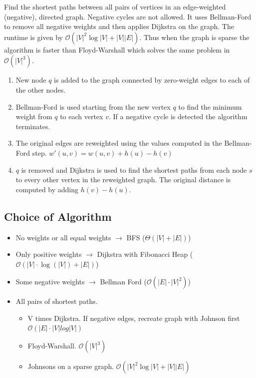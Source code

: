 \documentclass[9pt,landscape,a4paper, table]{extarticle}
\begin{document}
\begin{multicols*}{3}
Find the shortest paths between all pairs of vertices in an edge-weighted (negative), directed graph. Negative cycles are not allowed. It uses Bellman-Ford to remove all negative weights and then applies Dijkstra on the graph. The runtime is given by $\mathcal{O}(|V|^{2}\log |V|+|V||E|)$. Thus when the graph is sparse the algorithm is faster than Floyd-Warshall which solves the same problem in $\mathcal{O}(|V|
^3)$. 

\begin{enumerate}
    \item New node $q$ is added to the graph connected by zero-weight edges to each of the other nodes. 
    \item Bellman-Ford is used starting from the new vertex $q$ to find the minimum weight from $q$ to each vertex $v$. If a negative cycle is detected the algorithm terminates. 
    \item The original edges are reweighted using the values computed in the Bellman-Ford step. $w'(u,v) = w(u,v) + h(u) - h(v)$
    \item $q$ is removed and Dijkstra is used to find the shortest paths from each node $s$ to every other vertex in the reweighted graph. The original distance is computed by adding $h(v)- h(u)$.
\end{enumerate}

\subsection{Choice of Algorithm}
\begin{itemize}
	\item No weights or all equal weights $\rightarrow$ BFS ($\Theta(|V|+|E|)$)
	\item Only positive weights $\rightarrow$ Dijkstra with Fibonacci Heap ($\mathcal{O}(|V|\cdot \log(|V|) + |E|)$)
	\item Some negative weights $\rightarrow$ Bellman Ford ($\mathcal{O}(|E|\cdot|V|^2)$)
	\item All pairs of shortest paths.
	\begin{itemize}
	    \item V times Dijkstra. If negative edges, recreate graph with Johnson first $\mathcal{O}(|E| \cdot |V|  log |V| )$
	    \item Floyd-Warshall. $\mathcal{O}( |V|^3 )$
	    \item Johnsons on a sparse graph. $\mathcal{O}(|V|^{2}\log |V|+|V||E|)$
	\end{itemize} 
	

\end{itemize}
\end{multicols*}
\end{document}
